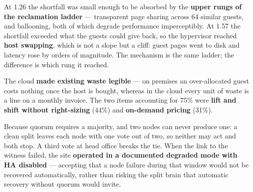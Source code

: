 \begin{ans}
  \item At 1.26 the shortfall was small enough to be absorbed by the
        \textbf{upper rungs of the reclamation ladder} --- transparent page
        sharing across 64 similar guests, and ballooning, both of which degrade
        performance imperceptibly. At 1.57 the shortfall exceeded what the guests
        could give back, so the hypervisor reached \textbf{host swapping}, which
        is not a slope but a cliff: guest pages went to disk and latency rose by
        orders of magnitude. The mechanism is the same ladder; the difference is
        which rung it reached.
  \item The cloud \textbf{made existing waste legible} --- on premises an
        over-allocated guest costs nothing once the host is bought, whereas in
        the cloud every unit of waste is a line on a monthly invoice. The two
        items accounting for 75\% were \textbf{lift and shift without
        right-sizing} (44\%) and \textbf{on-demand pricing} (31\%).
  \item Because quorum requires a majority, and two nodes can never produce one:
        a clean split leaves each node with one vote out of two, so neither may
        act and both stop. A third vote at head office breaks the tie. When the
        link to the witness failed, the site \textbf{operated in a documented
        degraded mode with HA disabled} --- accepting that a node failure during
        that window would not be recovered automatically, rather than risking
        the split brain that automatic recovery without quorum would invite.
\end{ans}

